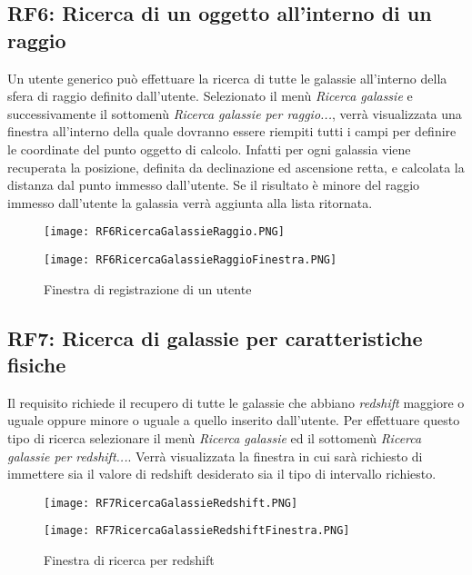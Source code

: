 \documentclass[12pt,a4paper,onecolumn,x11names]{article}
\begin{document}
	\subsection{RF6: Ricerca di un oggetto all'interno di un raggio}
		\begin{flushleft}
			Un utente generico può effettuare la ricerca di tutte le galassie all'interno della sfera di raggio definito dall'utente. Selezionato il menù \textit{Ricerca galassie} e successivamente il sottomenù \textit{Ricerca galassie per raggio...}, verrà visualizzata una finestra all'interno della quale dovranno essere riempiti tutti i campi per definire le coordinate del punto oggetto di calcolo. Infatti per ogni galassia viene recuperata la posizione, definita da declinazione ed ascensione retta, e calcolata la distanza dal punto immesso dall'utente. Se il risultato è minore del raggio immesso dall'utente la galassia verrà aggiunta alla lista ritornata.
		\end{flushleft}
			\begin{figure}[!h]
				\centering
				\begin{minipage}[c]{.45\textwidth}
					\texttt{[image: RF6RicercaGalassieRaggio.PNG]}
					\caption{Menù da selezionare per\newline ricercare galassie all'interno di un raggio}
				\end{minipage}%
				\centering
				\begin{minipage}[c]{.45\textwidth}
					\texttt{[image: RF6RicercaGalassieRaggioFinestra.PNG]}
					\caption{Finestra di registrazione di un utente}
				\end{minipage}%
			\end{figure}
		\newpage
	\subsection{RF7: Ricerca di galassie per caratteristiche fisiche}
		\begin{flushleft}
			Il requisito richiede il recupero di tutte le galassie che abbiano \textit{redshift} maggiore o uguale oppure minore o uguale a quello inserito dall'utente. Per effettuare questo tipo di ricerca selezionare il menù \textit{Ricerca galassie} ed il sottomenù \textit{Ricerca galassie per redshift...}. Verrà visualizzata la finestra in cui sarà richiesto di immettere sia il valore di redshift desiderato sia il tipo di intervallo richiesto.
		\end{flushleft}
		\begin{figure}[!h]
			\centering
			\begin{minipage}[c]{.45\textwidth}
				\texttt{[image: RF7RicercaGalassieRedshift.PNG]}
				\caption{Menù da selezionare per\newline ricercare galassie per redshift}
			\end{minipage}%
			\centering
			\begin{minipage}[c]{.45\textwidth}
				\texttt{[image: RF7RicercaGalassieRedshiftFinestra.PNG]}
				\caption{Finestra di ricerca per redshift}
			\end{minipage}%
		\end{figure}
\end{document}
